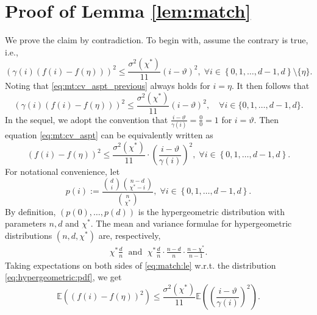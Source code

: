 \documentclass[onecolumn,letterpaper]{IEEEtran}
\newcommand{\plsize}{{\chi}}
\newcommand{\var}{{\sigma^{2}}}
\newcommand{\apn}{{\gamma}}
\newcommand{\cE}{{\mathbb{E}}}
\newcommand{\mnp}{{\vartheta}}
\newcommand{\idex}{{i}}
\newcommand{\arb}{{\eta}}
\begin{document}
\section{Proof of Lemma \ref{lem:match}}
\label{app:lem_match}
We prove the claim by contradiction. To begin with, assume the contrary is true, i.e., 
\begin{equation} \label{eq:mt:cv_aspt_previous}
    \left(\apn(\idex)(f(\idex) - f(\arb))\right)^2 \leq \frac{\var(\plsize^{*})} {11} (\idex-\mnp)^2 , \; \forall \idex \in \left\{0,1, \dots, d-1,d\right\} \setminus \{\arb\}.
\end{equation}
Noting that \eqref{eq:mt:cv_aspt_previous} always holds for $\idex = \arb$. It then follows that 
\begin{equation} \label{eq:mt:cv_aspt}
    \left(\apn(\idex)(f(\idex) - f(\arb))\right)^2 \leq \frac{\var(\plsize^{*})} {11} (\idex-\mnp)^2 , \quad \forall \idex \in \{0,1, \dots, d-1,d\}.
\end{equation}
In the sequel, we adopt the convention that $\frac{\idex-\mnp}{ \apn(\idex)}=\frac {0}{0}=1$ for $\idex=\mnp$.
Then equation \eqref{eq:mt:cv_aspt} can be equivalently written as
\begin{equation} 
\label{eq:match:le}
    \left(f(\idex) - f(\arb)\right)^2 \leq  \frac{\var(\plsize^{*})}{11} \cdot \left(\frac{\idex-\mnp}{\apn(\idex)}\right)^2 ,  \;\forall \idex \in \left\{0,1, \dots, d-1,d\right\}.
\end{equation}
For notational convenience, let
\begin{equation}
\label{eq:hypergeometric:pdf}
 p(\idex):= \frac{\binom{d}{\idex}\binom{n-d}{\plsize^{*}-\idex}}{\binom{n}{\plsize^{*}}} ,  \;\forall \idex \in \left\{0,1, \dots, d-1,d\right\}.
\end{equation}
By definition, $\left(p(0),\dots, p(d)\right)$ is the hypergeometric distribution with parameters $n,d$ and $\plsize^{*}$. The mean and variance formulae for hypergeometric distributions $(n,d, \plsize^{*})$ are, respectively, 
\begin{align}
\label{eq:mean:var:formulae}
   \plsize^{*} \frac d n  \;
   \text{  and }  \;
   \plsize^{*} \frac {d} {n}\cdot\frac {n-d} {n}\cdot\frac {n-\plsize^{*}} {n-1}.
\end{align}
Taking expectations on both sides of \eqref{eq:match:le} w.r.t. the distribution \eqref{eq:hypergeometric:pdf}, we get
\begin{equation}
    \cE \left(\left( f(\idex) - f(\arb)\right )^2\right) \le \frac{\var(\plsize^{*})}{11} \cE \left( \left(\frac{\idex-\mnp}{\apn(\idex)}\right)^2 \right) . \label{eq:mt:E_up}
\end{equation}
\end{document}
